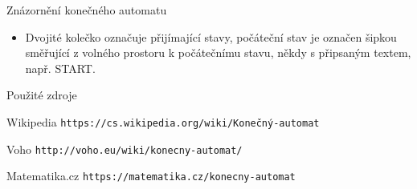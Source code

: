 \documentclass[10pt, hyperref={unicode}]{beamer}
\begin{document}
\begin{frame}{Znázornění konečného automatu}

	\begin{figure}[h]
		\centering
	\end{figure}
\begin{itemize}
    \item Dvojité kolečko označuje přijímající stavy, počáteční stav je označen šipkou směřující z volného prostoru k počátečnímu stavu, někdy s připsaným textem, např. START.
\end{itemize}
\end{frame}
\begin{frame}{Použité zdroje}
	\begin{thebibliography}{10}
		 Wikipedia
		\newblock \texttt{https://cs.wikipedia.org/wiki/Konečný-automat}
		
		 Voho
		\newblock \texttt{http://voho.eu/wiki/konecny-automat/}
		
		 Matematika.cz
		\newblock \texttt{https://matematika.cz/konecny-automat}
		
	\end{thebibliography}
\end{frame}
\end{document}
